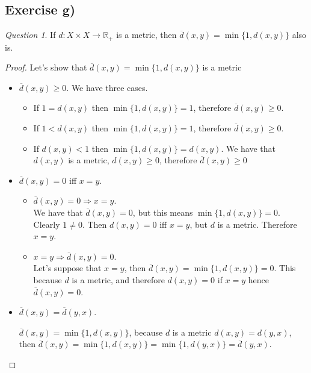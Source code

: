 \documentclass[11pt]{article}
\theoremstyle{definition}
\theoremstyle{remark}
\theoremstyle{remark}
\theoremstyle{remark}
\newtheorem*{question}{Question}
\begin{document}

\subsection*{Exercise g)}

\begin{question}
  If $d : X \times X \to \mathbb{R}_{+}$ is a metric, then
  $\overline{d}(x,y) = \min{\{1,d(x,y)\}}$ also is.
\end{question}
\begin{proof}
  Let's show that $\overline{d}(x,y) = \min{\{1,d(x,y)\}}$ is a metric
  \begin{itemize}
    \item $\overline{d}(x,y) \geq 0$. We have three cases.
      \begin{itemize}
        \item If $1 = d(x,y)$ then $\min{\{1,d(x,y)\}} = 1$, therefore
          $\overline{d}(x,y) \geq 0$.
        \item If $1 < d(x,y)$ then $\min{\{1,d(x,y)\}} = 1$, therefore
          $\overline{d}(x,y) \geq 0$.
        \item If $d(x,y) < 1$ then $\min{\{1,d(x,y)\}} = d(x,y)$. We have that
          $d(x,y)$ is a metric, $d(x,y) \geq 0$, therefore
          $\overline{d}(x,y) \geq 0$
      \end{itemize}
    \item $\overline{d}(x,y) = 0$ iff $x = y$.
      \begin{itemize}
        \item $\overline{d}(x,y) = 0 \Rightarrow x = y$. \\

          We have that $\overline{d}(x,y) = 0$, but this means
          $\min{\{1,d(x,y)\}} = 0$. Clearly $1 \neq 0$. Then $d(x,y) = 0$ iff
          $x = y$, but $d$ is a metric. Therefore $x = y$.
          \item $x = y \Rightarrow \overline{d}(x,y) = 0$. \\

          Let's suppose that $x = y$, then
          $\overline{d}(x,y) = \min{\{1,d(x,y)\}} = 0$. This because $d$ is a
          metric, and therefore $d(x,y) = 0$ if $x = y$ hence
          $\overline{d}(x,y) = 0$.
    \end{itemize}
    \item $\overline{d}(x,y) = \overline{d}(y,x)$.

      $\overline{d}(x,y) = \min{\{1,d(x,y)\}}$, because $d$ is a metric
      $d(x,y) = d(y,x)$, then
      $\overline{d}(x,y) = \min{\{1,d(x,y)\}} = \min{\{1,d(y,x)\}} = \overline{d}(y,x)$.


\end{itemize}
\end{proof}
\end{document}
